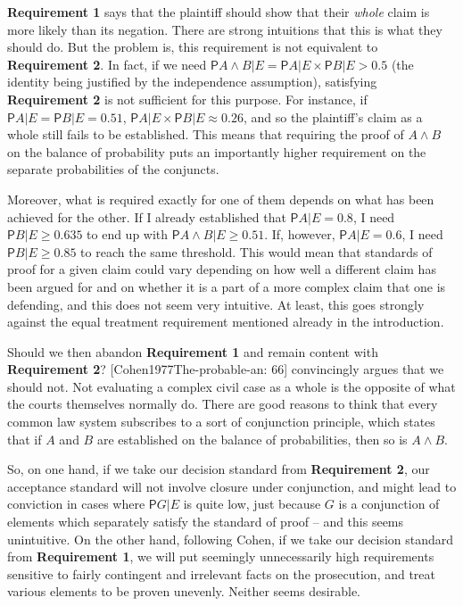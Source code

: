\documentclass[10pt,dvipsnames,enabledeprecatedfontcommands]{scrartcl}
\newcommand{\et}{\wedge}
\newcommand{\pr}{\mathsf{P}}
\begin{document}
\textbf{Requirement 1} says that the plaintiff should show that their
\emph{whole} claim is more likely than its negation. There are strong
intuitions that this is what they should do. But the problem is, this
requirement is not equivalent to \textbf{Requirement 2}. In fact, if we
need \(\pr{A\et B\vert E}=\pr{A\vert E}\times\pr{B\vert E}>0.5\) (the
identity being justified by the independence assumption), satisfying
\textbf{Requirement 2} is not sufficient for this purpose. For instance,
if \(\pr{A\vert E}=\pr{B\vert E}=0.51\),
\(\pr{A\vert E}\times \pr{B\vert E}\approx 0.26\), and so the
plaintiff's claim as a whole still fails to be established. This means
that requiring the proof of \(A\et B\) on the balance of probability
puts an importantly higher requirement on the separate probabilities of
the conjuncts.

Moreover, what is required exactly for one of them depends on what has
been achieved for the other. If I already established that
\(\pr{A\vert E}=0.8\), I need \(\pr{B\vert E}\geq 0.635\) to end up with
\(\pr{A\et B\vert E}\geq 0.51\). If, however, \(\pr{A\vert E}=0.6\), I
need \(\pr{B\vert E}\geq 0.85\) to reach the same threshold. This would
mean that standards of proof for a given claim could vary depending on
how well a different claim has been argued for and on whether it is a
part of a more complex claim that one is defending, and this does not
seem very intuitive. At least, this goes strongly against the equal
treatment requirement mentioned already in the introduction.

Should we then abandon \textbf{Requirement 1} and remain content with
\textbf{Requirement 2}? {[}Cohen1977The-probable-an: 66{]} convincingly
argues that we should not. Not evaluating a complex civil case as a
whole is the opposite of what the courts themselves normally do. There
are good reasons to think that every common law system subscribes to a
sort of conjunction principle, which states that if \(A\) and \(B\) are
established on the balance of probabilities, then so is \(A\et B\).

So, on one hand, if we take our decision standard from
\textbf{Requirement 2}, our acceptance standard will not involve closure
under conjunction, and might lead to conviction in cases where
\(\pr{G\vert E}\) is quite low, just because \(G\) is a conjunction of
elements which separately satisfy the standard of proof -- and this
seems unintuitive. On the other hand, following Cohen, if we take our
decision standard from \textbf{Requirement 1}, we will put seemingly
unnecessarily high requirements sensitive to fairly contingent and
irrelevant facts on the prosecution, and treat various elements to be
proven unevenly. Neither seems desirable.
\end{document}
